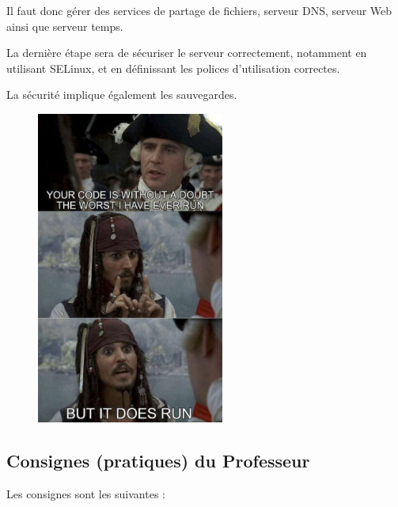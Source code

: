 \documentclass{article}
\begin{document}
Il faut donc gérer des services de partage de fichiers, serveur DNS, serveur Web ainsi que serveur temps.
	
La dernière étape sera de sécuriser le serveur correctement, notamment en utilisant SELinux, et en définissant les polices d'utilisation correctes.

La sécurité implique également les sauvegardes.
	

\begin{figure}[h]
\centering
\includegraphics[width=0.55\textwidth]{jack.png}
\label{fig:meme}
\end{figure}
\newpage
	
\subsection{Consignes (pratiques) du Professeur}
	
Les consignes sont les suivantes : 
	
\end{document}
